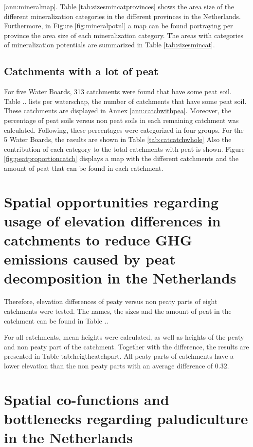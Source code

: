 {\begin{enumerate}
\ref{ann:mineralmap}. Table \ref{tab:sizesmincatprovinces} shows the area size of the different mineralization categories in the different provinces in the Netherlands. Furthermore, in Figure \ref{fig:mineralpotnl} a map can be found portraying per province the area size of each mineralization category. The areas with categories of mineralization potentials are summarized in Table \ref{tab:sizesmincat}.

\subsection{Catchments with a lot of peat}

For five Water Boards, 313 catchments were found that have some peat soil. Table .. lists per waterschap, the number of catchments that have some peat soil. These catchments are displayed in Annex \ref{ann:catchwithpea}. Moreover, the percentage of peat soils versus non peat soils in each remaining catchment was calculated. Following, these percentages were categorized in four groups. For the 5 Water Boards, the results are shown in Table \ref{tab:catcatchwhole} Also the contribution of each category to the total catchments with peat is shown. Figure \ref{fig:peatproportioncatch} displays a map with the different catchments and the amount of peat that can be found in each catchment.

\section{Spatial opportunities regarding usage of elevation differences in catchments to reduce GHG emissions caused by peat decomposition in the Netherlands}

Therefore, elevation differences of peaty versus non peaty parts of eight catchments were tested. The names, the sizes and the amount of peat in the catchment can be found in Table ..

For all catchments, mean heights were calculated, as well as heights of the peaty and non peaty part of the catchment. Together with the difference, the results are presented in Table {tab:heigthcatchpart}. All peaty parts of catchments have a lower elevation than the non peaty parts with an average difference of 0.32. 


\section{Spatial co-functions and bottlenecks regarding paludiculture in the Netherlands}




\end{enumerate}}
